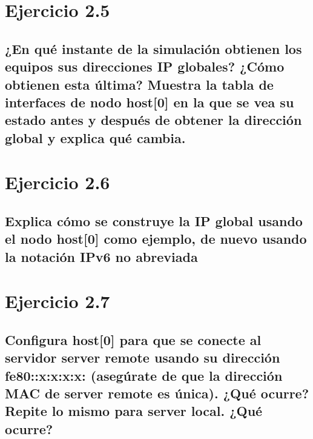 \section{Ejercicio 2.5}
\subsection{¿En qué instante de la simulación obtienen los equipos sus direcciones IP globales? ¿Cómo obtienen esta
última? Muestra la tabla de interfaces de nodo host[0] en la que se vea su estado antes y después de obtener la
dirección global y explica qué cambia.}

\section{Ejercicio 2.6}
\subsection{Explica cómo se construye la IP global usando el nodo host[0] como ejemplo, de nuevo usando la notación
IPv6 no abreviada}

\section{Ejercicio 2.7}
\subsection{Configura host[0] para que se conecte al servidor server remote usando su dirección fe80::x:x:x:x:
(asegúrate de que la dirección MAC de server remote es única). ¿Qué ocurre? Repite lo mismo para
server local. ¿Qué ocurre?}